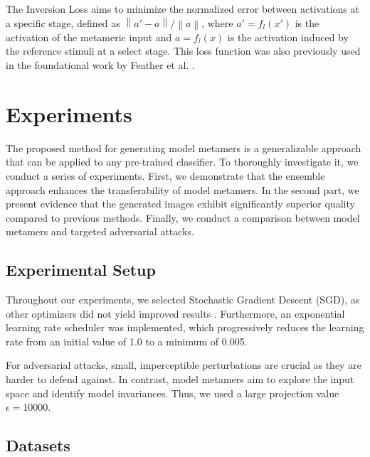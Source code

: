 \documentclass[pdflatex,sn-mathphys-num]{sn-jnl}%
\newcommand{\norm}[1]{\left\lVert #1 \right\rVert}
\theoremstyle{thmstyleone}%
\theoremstyle{thmstyletwo}%
\theoremstyle{thmstylethree}%
\begin{document}
The Inversion Loss aims to minimize the normalized error between activations at a specific stage, defined as ${\norm{a' - a}}/{\norm{a}}$, where $a' = f_l(x')$ is the activation of the metameric input and $a = f_l(x)$ is the activation induced by the reference stimuli at a select stage.
This loss function was also previously used in the foundational work by Feather et al. \cite{feather_model_2023}.


\section{Experiments}

The proposed method for generating model metamers is a generalizable approach that can be applied to any pre-trained classifier. To thoroughly investigate it, we conduct a series of experiments.
First, we demonstrate that the ensemble approach enhances the transferability of model metamers. In the second part, we present evidence that the generated images exhibit significantly superior quality compared to previous methods. Finally, we conduct a comparison between model metamers and targeted adversarial attacks.

\subsection{Experimental Setup}

Throughout our experiments, we selected Stochastic Gradient Descent (SGD), as other optimizers did not yield improved results \cite{feather_model_2023}. Furthermore, an exponential learning rate scheduler was implemented, which progressively reduces the learning rate from an initial value of 1.0 to a minimum of 0.005.

For adversarial attacks, small, imperceptible perturbations are crucial as they are harder to defend against. In contrast, model metamers aim to explore the input space and identify model invariances. Thus, we used a large projection value $\epsilon = 10000$.

\subsection{Datasets}
\end{document}
